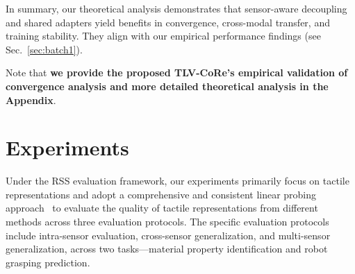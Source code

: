 \documentclass[letterpaper]{article} %
\theoremstyle{definition}                %
\theoremstyle{plain}                     %
\theoremstyle{remark}                    %
\begin{document}
In summary, our theoretical analysis demonstrates that sensor-aware decoupling and shared adapters yield benefits in convergence, cross-modal transfer, and training stability. They align with our empirical performance findings (see Sec.~\ref{sec:batch1}).

Note that \textbf{we provide the proposed TLV-CoRe's empirical validation of convergence analysis and more detailed theoretical analysis in the Appendix}.

\section{Experiments}
\label{sec:experiment}


Under the RSS evaluation framework, our experiments primarily focus on tactile representations and adopt a comprehensive and consistent linear probing approach~\cite{cheng2025touch100k, feng2025anytouch, lei2024vit} to evaluate the quality of tactile representations from different methods across three evaluation protocols. The specific evaluation protocols include intra-sensor evaluation, cross-sensor generalization, and multi-sensor generalization, across two tasks—material property identification and robot grasping prediction.
\end{document}
